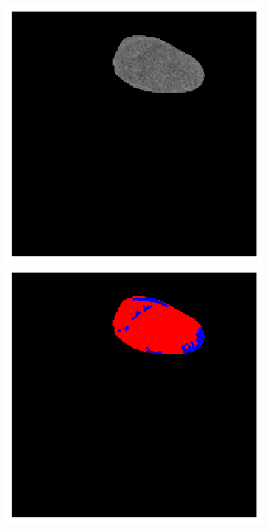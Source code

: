 {\begin{figure}[!ht]
	\begin{mdframed}[backgroundcolor=blue!50,linecolor=blue!50]
	\centering
	\begin{minipage}{4cm}
		\includegraphics[width=\linewidth]{images/NecrosisVE_Raw_Pat0_8}
	\end{minipage} \hspace{-0.3cm}
	\begin{minipage}{4cm}
		\includegraphics[width=\linewidth]{images/NecrosisVE_GT_Pat0_8}

\end{minipage}
\end{mdframed}
\end{figure}}
